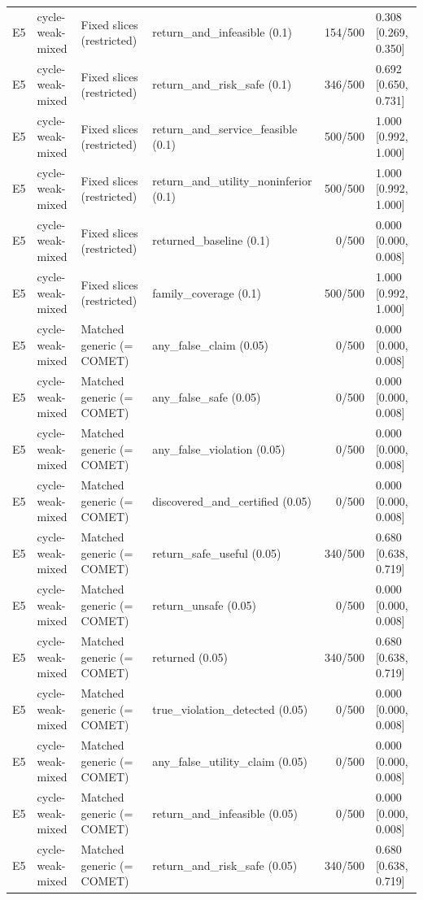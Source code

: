 \begin{longtable}{p{.04\linewidth}p{.18\linewidth}p{.19\linewidth}p{.16\linewidth}r p{.21\linewidth}}
E5 & cycle-weak-mixed & Fixed slices (restricted) & return\_and\_infeasible (0.1) & 154/500 & 0.308 [0.269, 0.350]\\
E5 & cycle-weak-mixed & Fixed slices (restricted) & return\_and\_risk\_safe (0.1) & 346/500 & 0.692 [0.650, 0.731]\\
E5 & cycle-weak-mixed & Fixed slices (restricted) & return\_and\_service\_feasible (0.1) & 500/500 & 1.000 [0.992, 1.000]\\
E5 & cycle-weak-mixed & Fixed slices (restricted) & return\_and\_utility\_noninferior (0.1) & 500/500 & 1.000 [0.992, 1.000]\\
E5 & cycle-weak-mixed & Fixed slices (restricted) & returned\_baseline (0.1) & 0/500 & 0.000 [0.000, 0.008]\\
E5 & cycle-weak-mixed & Fixed slices (restricted) & family\_coverage (0.1) & 500/500 & 1.000 [0.992, 1.000]\\
E5 & cycle-weak-mixed & Matched generic (= COMET) & any\_false\_claim (0.05) & 0/500 & 0.000 [0.000, 0.008]\\
E5 & cycle-weak-mixed & Matched generic (= COMET) & any\_false\_safe (0.05) & 0/500 & 0.000 [0.000, 0.008]\\
E5 & cycle-weak-mixed & Matched generic (= COMET) & any\_false\_violation (0.05) & 0/500 & 0.000 [0.000, 0.008]\\
E5 & cycle-weak-mixed & Matched generic (= COMET) & discovered\_and\_certified (0.05) & 0/500 & 0.000 [0.000, 0.008]\\
E5 & cycle-weak-mixed & Matched generic (= COMET) & return\_safe\_useful (0.05) & 340/500 & 0.680 [0.638, 0.719]\\
E5 & cycle-weak-mixed & Matched generic (= COMET) & return\_unsafe (0.05) & 0/500 & 0.000 [0.000, 0.008]\\
E5 & cycle-weak-mixed & Matched generic (= COMET) & returned (0.05) & 340/500 & 0.680 [0.638, 0.719]\\
E5 & cycle-weak-mixed & Matched generic (= COMET) & true\_violation\_detected (0.05) & 0/500 & 0.000 [0.000, 0.008]\\
E5 & cycle-weak-mixed & Matched generic (= COMET) & any\_false\_utility\_claim (0.05) & 0/500 & 0.000 [0.000, 0.008]\\
E5 & cycle-weak-mixed & Matched generic (= COMET) & return\_and\_infeasible (0.05) & 0/500 & 0.000 [0.000, 0.008]\\
E5 & cycle-weak-mixed & Matched generic (= COMET) & return\_and\_risk\_safe (0.05) & 340/500 & 0.680 [0.638, 0.719]\\

\end{longtable}

